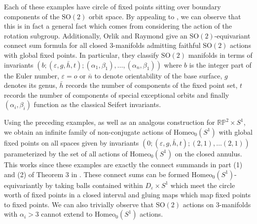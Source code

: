 \documentclass[10pt, oneside]{article}
\newcommand{\RP}{\mathbb{RP}}
\newcommand{\SO}[1][2]{\text{SO}(#1)}
\newcommand{\homeo}[1][S^1]{\text{Homeo}_0(#1)}
\theoremstyle{definition}
\theoremstyle{definition}
\newtheorem{question}{Question}[section]
\begin{document}
Each of these examples have circle of fixed points sitting over boundary components of the $\SO$ orbit space. By appealing to \cite{orlik:ActionsSO2}, we can observe that this is in fact a general fact which comes from considering the action of the rotation subgroup. Additionally, Orlik and Raymond give an $\SO$-equivariant connect sum formula for all closed 3-manifolds admitting faithful $\SO$ actions with global fixed points. In particular, they classify $\SO$ manifolds in terms of invariants $(b; (\varepsilon, g, \bar{h}, t); (\alpha_1, \beta_1),\dots, (\alpha_n, \beta_1))$
where $b$ is the integer part of the Euler number, $\varepsilon = o\text{ or }\bar{n}$ to denote orientability of the base surface, $g$ denotes its genus, $\bar{h}$ records the number of components of the fixed point set, $t$ records the number of components of special exceptional orbits and finally $(\alpha_i, \beta_i)$ function as the classical Seifert invariants. 

Using the preceding examples, as well as an analgous construction for $\RP^2\times S^1$, we obtain an infinite family of non-conjugate actions of $\homeo$ with global fixed points on all spaces given by invariants $(0; (\varepsilon, g, \bar{h}, t); (2, 1),\dots (2, 1))$ parameterized by the set of all actions of $\homeo$ on the closed annulus. This works since these examples are exactly the connect summands in part (1) and (2) of Theorem 3 in \cite{orlik:ActionsSO2}. These connect sums can be formed $\homeo$-equivariantly by taking balls contained within $D_\varepsilon \times S^1$ which meet the circle worth of fixed points in a closed interval and gluing maps which map fixed points to fixed points. We can also trivially observe that $\SO$ actions on 3-manifolds with $\alpha_i > 3$ cannot extend to $\homeo$ actions. 

\end{document}
